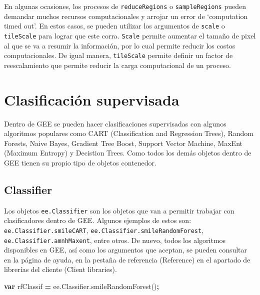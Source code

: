 \documentclass[
]{article}
\newenvironment{Shaded}{\begin{snugshade}}{\end{snugshade}}
\newcommand{\AttributeTok}[1]{\textcolor[rgb]{0.77,0.63,0.00}{#1}}
\newcommand{\KeywordTok}[1]{\textcolor[rgb]{0.13,0.29,0.53}{\textbf{#1}}}
\newcommand{\NormalTok}[1]{#1}
\newcommand{\OperatorTok}[1]{\textcolor[rgb]{0.81,0.36,0.00}{\textbf{#1}}}
\newcommand{\VariableTok}[1]{\textcolor[rgb]{0.00,0.00,0.00}{#1}}
\begin{document}
\begin{tipblock}
En algunas ocasiones, los procesos de \texttt{reduceRegions} o
\texttt{sampleRegions} pueden demandar muchos recursos computacionales y
arrojar un error de `computation timed out'. En estos casos, se pueden
utilizar los argumentos de \texttt{scale} o \texttt{tileScale} para
lograr que este corra. \texttt{Scale} permite aumentar el tamaño de
pixel al que se va a resumir la información, por lo cual permite reducir
los costos computacionales. De igual manera, \texttt{tileScale} permite
definir un factor de reescalamiento que permite reducir la carga
computacional de un proceso.

\end{tipblock}

\newpage

\hypertarget{clasificaciuxf3n-supervisada}{%
\section{Clasificación supervisada}\label{clasificaciuxf3n-supervisada}}

Dentro de GEE se pueden hacer clasificaciones supervisadas con algunos
algoritmos populares como CART (Classification and Regression Trees),
Random Forests, Naive Bayes, Gradient Tree Boost, Support Vector
Machine, MaxEnt (Maximum Entropy) y Decistion Trees. Como todos los
demás objetos dentro de GEE tienen su propio tipo de objetos contenedor.

\hypertarget{classifier}{%
\subsection{Classifier}\label{classifier}}

Los objetos \texttt{ee.Classifier} son los objetos que van a permitir
trabajar con clasificadores dentro de GEE. Algunos ejemplos de estos
son: \texttt{ee.Classifier.smileCART},
\texttt{ee.Classifier.smileRandomForest},
\texttt{ee.Classifier.amnhMaxent}, entre otros. De nuevo, todos los
algoritmos disponibles en GEE, así como los argumentos que aceptan, se
pueden consultar en la página de ayuda, en la pestaña de referencia
(Reference) en el apartado de librerías del cliente (Client libraries).

\begin{Shaded}
\begin{Highlighting}[]
\KeywordTok{var}\NormalTok{ rfClassif }\OperatorTok{=} \VariableTok{ee}\NormalTok{.}\VariableTok{Classifier}\NormalTok{.}\AttributeTok{smileRandomForest}\NormalTok{()}\OperatorTok{;}
\end{Highlighting}
\end{Shaded}
\end{document}
